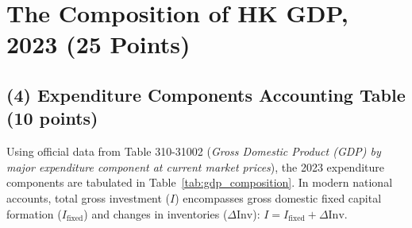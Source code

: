\documentclass[11pt,a4paper]{article}
\begin{document}
\section{The Composition of HK GDP, 2023 (25 Points)}

\subsection*{(4) Expenditure Components Accounting Table (10 points)}
Using official data from Table 310-31002 (\textit{Gross Domestic Product (GDP) by major expenditure component at current market prices}), the 2023 expenditure components are tabulated in Table~\ref{tab:gdp_composition}. In modern national accounts, total gross investment ($I$) encompasses gross domestic fixed capital formation ($I_{\text{fixed}}$) and changes in inventories ($\Delta \text{Inv}$): $I = I_{\text{fixed}} + \Delta \text{Inv}$.
\end{document}
